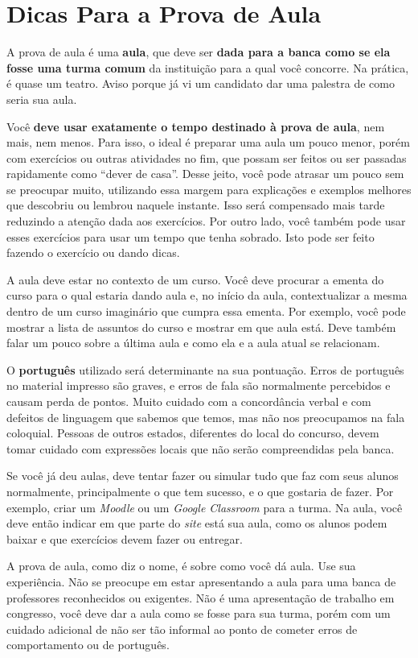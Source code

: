 \documentclass{article}
\begin{document}
\section{Dicas Para a Prova de Aula}

A prova de aula é uma \textbf{aula}, que deve ser \textbf{dada para a banca como se ela fosse uma turma comum} da instituição para a qual você concorre. Na prática, é quase um teatro. Aviso porque já vi um candidato dar uma palestra de como seria sua aula.

Você \textbf{deve usar exatamente o tempo destinado à prova de aula}, nem mais, nem menos. Para isso, o ideal é preparar uma aula um pouco menor, porém com exercícios ou outras atividades no fim, que possam ser feitos ou ser passadas rapidamente como ``dever de casa''. 
Desse jeito, você pode atrasar um pouco sem se preocupar muito, utilizando essa margem para explicações e exemplos melhores que descobriu ou lembrou naquele instante. Isso será compensado mais tarde reduzindo a atenção dada aos exercícios.
Por outro lado, você também pode usar esses exercícios para usar um tempo que tenha sobrado. Isto pode ser feito fazendo o exercício ou dando dicas.

A aula deve estar no contexto de um curso. Você deve procurar a ementa do curso para o qual estaria dando aula e, no início da aula, contextualizar a mesma dentro de um curso imaginário que cumpra essa ementa. Por exemplo, você pode mostrar a lista de assuntos do curso e mostrar em que aula está. Deve também falar um pouco sobre a última aula e como ela e a aula atual se relacionam.

O \textbf{português} utilizado será determinante na sua pontuação. Erros de português no material impresso são graves, e erros de fala são normalmente percebidos e causam perda de pontos. Muito cuidado com a concordância verbal e com defeitos de linguagem que sabemos que temos, mas não nos preocupamos na fala coloquial. Pessoas de outros estados, diferentes do local do concurso, devem tomar cuidado com expressões locais que não serão compreendidas pela banca.

Se você já deu aulas, deve tentar fazer ou simular tudo que faz com seus alunos normalmente, principalmente o que tem sucesso, e o que gostaria de fazer. Por exemplo, criar um \textit{Moodle} ou um \textit{Google Classroom} para a turma. Na aula, você deve então indicar em que parte do \textit{site} está sua aula, como os alunos podem baixar e que exercícios devem fazer ou entregar.

A prova de aula, como diz o nome, é sobre como você dá aula. Use sua experiência. Não se preocupe em estar apresentando a aula para uma banca de professores reconhecidos ou exigentes. Não é uma apresentação de trabalho em congresso, você deve dar a aula  como se fosse para sua turma, porém com um cuidado adicional de não ser tão informal ao ponto de cometer erros de comportamento ou de português.
\end{document}
